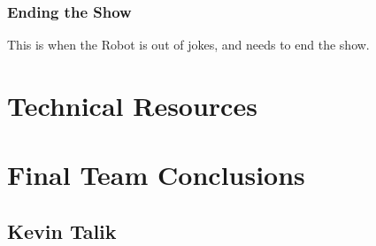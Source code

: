 \documentclass[onecolumn, draftclsnofoot,10pt, compsoc]{IEEEtran}
\begin{document}
    \subsubsection{Ending the Show}
    
    This is when the Robot is out of jokes, and needs to end the show.
 


\section{Technical Resources}

\pagebreak
\section{Final Team Conclusions}
\subsection{Kevin Talik}
\end{document}
